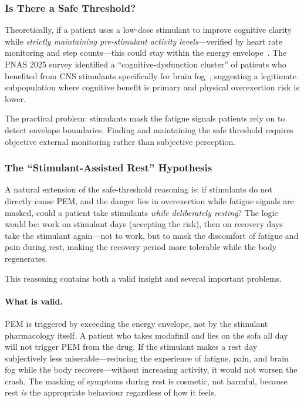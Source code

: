 \subsubsection{Is There a Safe Threshold?}

Theoretically, if a patient uses a low-dose stimulant to improve cognitive clarity while \textit{strictly maintaining pre-stimulant activity levels}---verified by heart rate monitoring and step counts---this could stay within the energy envelope~\cite{Jason2013envelope}. The PNAS 2025 survey identified a ``cognitive-dysfunction cluster'' of patients who benefited from CNS stimulants specifically for brain fog~\cite{Vernon2025PNAS}, suggesting a legitimate subpopulation where cognitive benefit is primary and physical overexertion risk is lower.

The practical problem: stimulants mask the fatigue signals patients rely on to detect envelope boundaries. Finding and maintaining the safe threshold requires objective external monitoring rather than subjective perception.

\subsubsection{The ``Stimulant-Assisted Rest'' Hypothesis}

A natural extension of the safe-threshold reasoning is: if stimulants do not directly cause PEM, and the danger lies in overexertion while fatigue signals are masked, could a patient take stimulants \textit{while deliberately resting}? The logic would be: work on stimulant days (accepting the risk), then on recovery days take the stimulant again---not to work, but to mask the discomfort of fatigue and pain during rest, making the recovery period more tolerable while the body regenerates.

This reasoning contains both a valid insight and several important problems.

\paragraph{What is valid.}
PEM is triggered by exceeding the energy envelope, not by the stimulant pharmacology itself. A patient who takes modafinil and lies on the sofa all day will not trigger PEM from the drug. If the stimulant makes a rest day subjectively less miserable---reducing the experience of fatigue, pain, and brain fog while the body recovers---without increasing activity, it would not worsen the crash. The masking of symptoms during rest is cosmetic, not harmful, because rest \textit{is} the appropriate behaviour regardless of how it feels.

